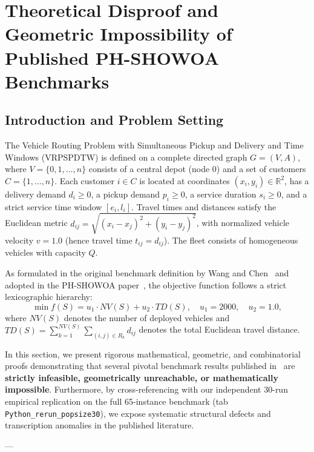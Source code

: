 \section{Theoretical Disproof and Geometric Impossibility of Published PH-SHOWOA Benchmarks}
\label{sec:geometric_disproof}

\subsection{Introduction and Problem Setting}
The Vehicle Routing Problem with Simultaneous Pickup and Delivery and Time Windows (VRPSPDTW) is defined on a complete directed graph $G = (V, A)$, where $V = \{0, 1, \dots, n\}$ consists of a central depot (node $0$) and a set of customers $C = \{1, \dots, n\}$. Each customer $i \in C$ is located at coordinates $(x_i, y_i) \in \mathbb{R}^2$, has a delivery demand $d_i \ge 0$, a pickup demand $p_i \ge 0$, a service duration $s_i \ge 0$, and a strict service time window $[e_i, l_i]$. Travel times and distances satisfy the Euclidean metric $d_{ij} = \sqrt{(x_i - x_j)^2 + (y_i - y_j)^2}$, with normalized vehicle velocity $v = 1.0$ (hence travel time $t_{ij} = d_{ij}$). The fleet consists of homogeneous vehicles with capacity $Q$.

As formulated in the original benchmark definition by Wang and Chen~\cite{wang2012coevolutionary} and adopted in the PH-SHOWOA paper~\cite{nguyen2026phshowoa}, the objective function follows a strict lexicographic hierarchy:
\begin{equation}
\label{eq:objective}
\min f(S) = u_1 \cdot NV(S) + u_2 \cdot TD(S), \quad u_1 = 2000, \quad u_2 = 1.0,
\end{equation}
where $NV(S)$ denotes the number of deployed vehicles and $TD(S) = \sum_{k=1}^{NV(S)} \sum_{(i,j) \in R_k} d_{ij}$ denotes the total Euclidean travel distance. 

In this section, we present rigorous mathematical, geometric, and combinatorial proofs demonstrating that several pivotal benchmark results published in~\cite{nguyen2026phshowoa} are \textbf{strictly infeasible, geometrically unreachable, or mathematically impossible}. Furthermore, by cross-referencing with our independent 30-run empirical replication on the full 65-instance benchmark (tab \texttt{Python\_rerun\_popsize30}), we expose systematic structural defects and transcription anomalies in the published literature.

---

